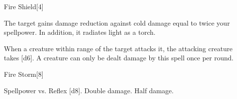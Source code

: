 \begin{spellsection}{Fire Shield}[4]
    \begin{spellheader}
    \end{spellheader}
    \begin{spellcontent}
        \begin{spelltargetinginfo}
        \end{spelltargetinginfo}
        \begin{spelleffects}
            \spelleffect The target gains damage reduction against cold damage equal to twice your spellpower. In addition, it radiates light as a torch.

            When a creature within \rngclose range of the target attacks it, the attacking creature takes [d6].
            A creature can only be dealt damage by this spell once per round.
            \spelldur \durshort \dismissable
        \end{spelleffects}
    \end{spellcontent}
    \begin{spellfooter}
        \miscastexplode
    \end{spellfooter}
    \begin{spellaugments}
    \end{spellaugments}
\end{spellsection}

\begin{spellsection}{Fire Storm}[8]
    \begin{spellheader}
    \end{spellheader}
    \begin{spellcontent}
        \begin{spelltargetinginfo}
        \end{spelltargetinginfo}
        \begin{spelleffects}
            \begin{spellattack}{Spellpower vs. Reflex}
                \spellsuccess {}[d8].
                \spellcritical Double damage.
                \spellfailure Half damage.
            \end{spellattack}
        \end{spelleffects}
    \end{spellcontent}
    \begin{spellfooter}
        \miscastyou
    \end{spellfooter}
\end{spellsection}

